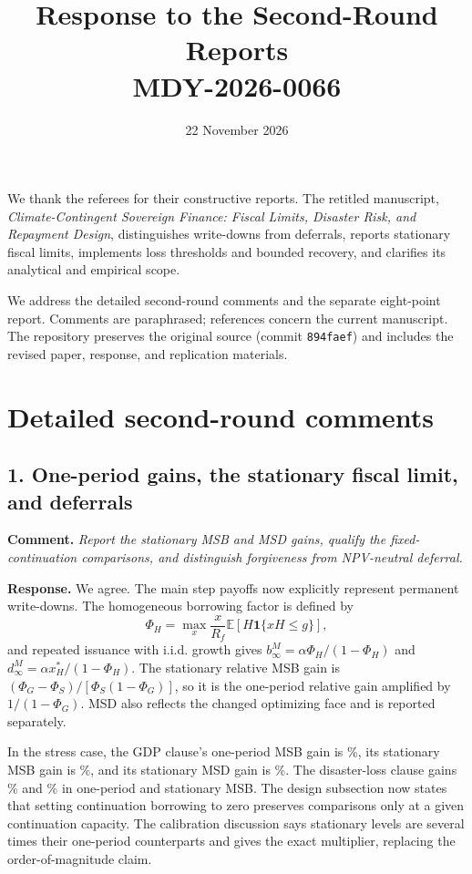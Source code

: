 \documentclass[11pt]{article}
\title{Response to the Second-Round Reports\\\large MDY-2026-0066}
\author{}
\date{22 November 2026}
\newcommand{\comment}[1]{\par\medskip\Needspace{7\baselineskip}\noindent\textbf{Comment.} \emph{#1}\par\smallskip}
\newcommand{\response}{\noindent\textbf{Response.} }
\begin{document}
\maketitle
We thank the referees for their constructive reports. The retitled manuscript, \emph{Climate-Contingent Sovereign Finance: Fiscal Limits, Disaster Risk, and Repayment Design}, distinguishes write-downs from deferrals, reports stationary fiscal limits, implements loss thresholds and bounded recovery, and clarifies its analytical and empirical scope.

We address the detailed second-round comments and the separate eight-point report. Comments are paraphrased; references concern the current manuscript. The repository preserves the original source (commit \texttt{894faef}) and includes the revised paper, response, and replication materials.

\section*{Detailed second-round comments}
\subsection*{1. One-period gains, the stationary fiscal limit, and deferrals}
\comment{Report the stationary MSB and MSD gains, qualify the fixed-continuation comparisons, and distinguish forgiveness from NPV-neutral deferral.}
\response We agree. The main step payoffs now explicitly represent permanent write-downs. The homogeneous borrowing factor is defined by
\[
\Phi_H=\max_x\frac{x}{R_f}\mathbb E[H\mathbf 1\{xH\le g\}],
\]
and repeated issuance with i.i.d. growth gives $b^M_\infty=\alpha\Phi_H/(1-\Phi_H)$ and $d^M_\infty=\alpha x_H^*/(1-\Phi_H)$. The stationary relative MSB gain is $(\Phi_G-\Phi_S)/[\Phi_S(1-\Phi_G)]$, so it is the one-period relative gain amplified by $1/(1-\Phi_G)$. MSD also reflects the changed optimizing face and is reported separately.

In the stress case, the GDP clause's one-period MSB gain is \LegacyGDPOneGain\%, its stationary MSB gain is \LegacyGDPStationaryGain\%, and its stationary MSD gain is \LegacyGDPMSDGain\%. The disaster-loss clause gains \LegacyDisasterOneGain\% and \LegacyDisasterStationaryGain\% in one-period and stationary MSB. The design subsection now states that setting continuation borrowing to zero preserves comparisons only at a given continuation capacity. The calibration discussion says stationary levels are several times their one-period counterparts and gives the exact multiplier, replacing the order-of-magnitude claim.
\end{document}
